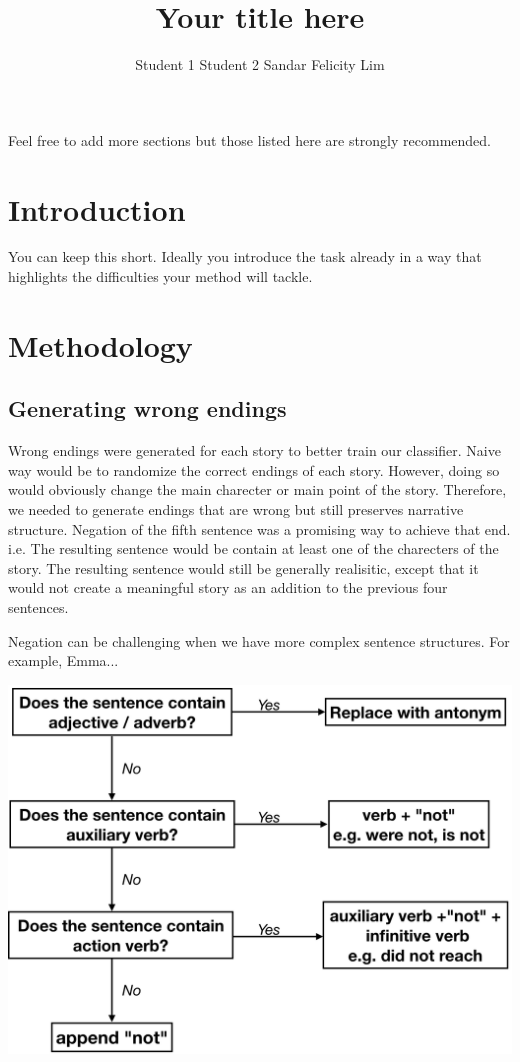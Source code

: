 \documentclass{article}
\title{Your title here}
\author{Student 1 \qquad Student 2 \qquad Sandar Felicity Lim}
\begin{document}

\maketitle


Feel free to add more sections but those listed here are strongly recommended.
\section{Introduction}
You can keep this short. Ideally you introduce the task already in a way that highlights the difficulties  your method will tackle.

\section{Methodology}
\subsection{Generating wrong endings}
Wrong endings were generated for each story to better train our classifier. Naive way would be to randomize the correct endings of each story. However, doing so would obviously change the main charecter or main point of the story. Therefore, we needed to generate endings that are wrong but still preserves narrative structure. Negation of the fifth sentence was a promising way to achieve that end. i.e. The resulting sentence would be contain at least one of the charecters of the story. The resulting sentence would still be generally realisitic, except that it would not create a meaningful story as an addition to the previous four sentences.

Negation can be challenging when we have more complex sentence structures. For example,
Emma...


\includegraphics[width=0.9 \linewidth]{wrong.PNG}
\end{document}
